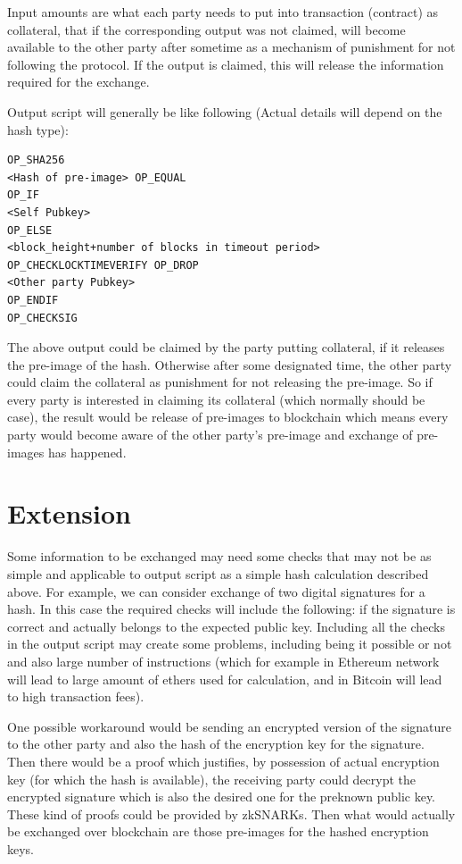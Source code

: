 \documentclass[]{article}
\begin{document}
Input amounts are what each party needs to put into transaction (contract) as collateral, that if the corresponding output was not claimed, will become available to the other party after sometime as a mechanism of punishment for not following the protocol. If the output is claimed, this will release the information required for the exchange.

Output script will generally be like following (Actual details will depend on the hash type):

\begin{verbatim}
OP_SHA256
<Hash of pre-image> OP_EQUAL
OP_IF
<Self Pubkey>
OP_ELSE
<block_height+number of blocks in timeout period> OP_CHECKLOCKTIMEVERIFY OP_DROP
<Other party Pubkey>
OP_ENDIF
OP_CHECKSIG
\end{verbatim}

The above output could be claimed by the party putting collateral, if it releases the pre-image of the hash. Otherwise after some designated time, the other party could claim the collateral as punishment for not releasing the pre-image. So if every party is interested in claiming its collateral (which normally should be case), the result would be release of pre-images to blockchain which means every party would become aware of the other party's pre-image and exchange of pre-images has happened.

\section{Extension}

Some information to be exchanged may need some checks that may not be as simple and applicable to output script as a simple hash calculation described above. For example, we can consider exchange of two digital signatures for a hash. In this case the required checks will include the following: if the signature is correct and actually belongs to the expected public key. Including all the checks in the output script may create some problems, including being it possible or not and also large number of instructions (which for example in Ethereum network will lead to large amount of ethers used for calculation, and in Bitcoin will lead to high transaction fees).

One possible workaround would be sending an encrypted version of the signature to the other party and also the hash of the encryption key for the signature. Then there would be a proof which justifies, by possession of actual encryption key (for which the hash is available), the receiving party could decrypt the encrypted signature which is also the desired one for the preknown public key. These kind of proofs could be provided by zkSNARKs\cite{ethzkSNARK}. Then what would actually be exchanged over blockchain are those pre-images for the hashed encryption keys.
\end{document}
